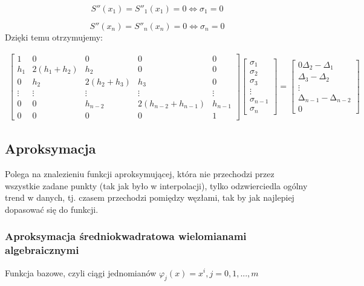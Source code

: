 \documentclass{article}
\begin{document}
\[S''(x_1) = S''_1(x_1) = 0 \Leftrightarrow \sigma_1 = 0\]

\[S''(x_n) = S''_n(x_n) = 0 \Leftrightarrow \sigma_n = 0\]
\noindent
Dzięki temu otrzymujemy:

\begin{gather*}
\begin{bmatrix}
1 & 0 & 0 & 0 & 0 \\
h_1 & 2(h_1+h_2) & h_2 & 0 & 0 \\
0 & h_2 & 2(h_2+h_3) & h_3 & 0 \\
\vdots & \vdots & \vdots & \vdots & \vdots \\
0 & 0 & h_{n-2} & 2(h_{n-2} + h_{n-1}) & h_{n-1} \\
0 & 0 & 0 & 0 & 1 
\end{bmatrix}
\begin{bmatrix}
\sigma_1 \\
\sigma_2 \\
\sigma_3 \\
\vdots \\
\sigma_{n-1} \\
\sigma_n 
\end{bmatrix}
=
\begin{bmatrix}
0 
\Delta_2 - \Delta_1 \\
\Delta_3 - \Delta_2 \\
\vdots \\
\mathrm{\Delta}_{n-1}^{} - \mathrm{\Delta}_{n-2}^{} \\
0
\end{bmatrix}
\end{gather*}

\newpage

\subsection{Aproksymacja}

Polega na znalezieniu funkcji aproksymującej, która nie przechodzi przez wszystkie zadane punkty (tak jak było w interpolacji), tylko odzwierciedla ogólny trend w danych, tj. czasem przechodzi pomiędzy węzłami, tak by jak najlepiej dopasować się do funkcji.

\subsubsection{Aproksymacja średniokwadratowa wielomianami algebraicznymi}

\noindent
Funkcja bazowe, czyli ciągi jednomianów \(\varphi _j(x) = x^i, j = 0, 1, ..., m\)
\end{document}
